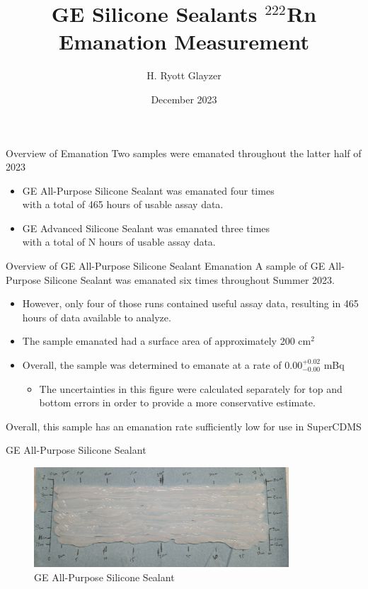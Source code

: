 \documentclass[aspectratio=169]{beamer}
\title{GE Silicone Sealants $^{222}$Rn Emanation Measurement}
\author[H. R. Glayzer]{H. Ryott Glayzer}
\institute[SDSMT]
{Lab Assistant\\
    SD Mines}
\date[2023]{December 2023}
\begin{document}
\frame{\titlepage}

\begin{frame}{Overview of Emanation}
    Two samples were emanated throughout the latter half of 2023
    \begin{itemize}
        \item GE All-Purpose Silicone Sealant was emanated four times\\
            with a total of 465 hours of usable assay data.
        \item GE Advanced Silicone Sealant was emanated three times\\
            with a total of N hours of usable assay data.
    \end{itemize}
\end{frame}

\begin{frame}{Overview of GE All-Purpose Silicone Sealant Emanation}
    A sample of GE All-Purpose Silicone Sealant was emanated six times throughout Summer 2023.
        \begin{itemize}
            \item However, only four of those runs contained useful assay data,\@
                resulting in 465 hours of data available to analyze.
            \item The sample emanated had a surface area of approximately 200 cm$^{2}$
            \item Overall, the sample was determined to emanate at a rate of 0.00$^{+0.02}_{-0.00}$ mBq
            \begin{itemize}
                \item The uncertainties in this figure were calculated separately for top\@
                    and bottom errors in order to provide a more conservative estimate.
            \end{itemize}
        \end{itemize}
    Overall, this sample has an emanation rate sufficiently low for use in SuperCDMS
\end{frame}

\begin{frame}{GE All-Purpose Silicone Sealant}
    \begin{figure}
         \centering
        \includegraphics[width=0.85\textwidth]{assets/all-purpose-sample.png}
        \caption{GE All-Purpose Silicone Sealant}
    \end{figure}
\end{frame}
\end{document}
